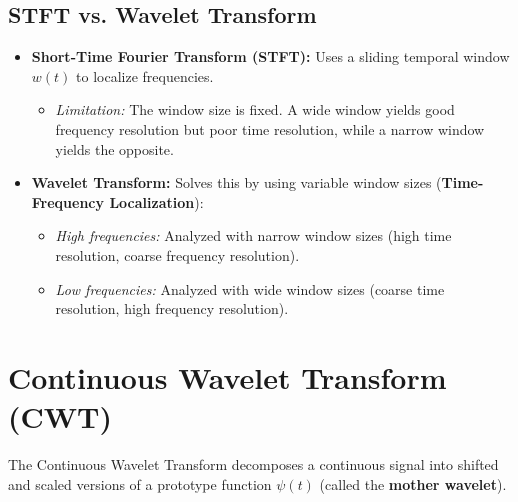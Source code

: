 \documentclass[12pt,a4paper]{article}
\begin{document}
\subsection{STFT vs. Wavelet Transform}
\begin{itemize}[leftmargin=*, itemsep=3.5pt]
  \item \textbf{Short-Time Fourier Transform (STFT):} Uses a sliding temporal window $w(t)$ to localize frequencies.
    \begin{itemize}[leftmargin=1em, itemsep=1pt]
      \item \textit{Limitation:} The window size is fixed. A wide window yields good frequency resolution but poor time resolution, while a narrow window yields the opposite.
    \end{itemize}
  \item \textbf{Wavelet Transform:} Solves this by using variable window sizes (\textbf{Time-Frequency Localization}):
    \begin{itemize}[leftmargin=1em, itemsep=1pt]
      \item \textit{High frequencies:} Analyzed with narrow window sizes (high time resolution, coarse frequency resolution).
      \item \textit{Low frequencies:} Analyzed with wide window sizes (coarse time resolution, high frequency resolution).
    \end{itemize}
\end{itemize}

\section{Continuous Wavelet Transform (CWT)}

The Continuous Wavelet Transform decomposes a continuous signal into shifted and scaled versions of a prototype function $\psi(t)$ (called the \textbf{mother wavelet}).
\end{document}
